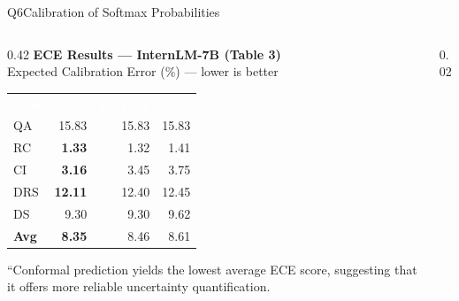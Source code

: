 \documentclass[aspectratio=169,10pt]{beamer}
\newcommand{\thead}[1]{%
  \cellcolor{TblHead}\textcolor{white}{\textbf{\footnotesize #1}}}
\newcommand{\talt}{\rowcolor{TblAlt}}
\begin{document}
\begin{frame}{Q6\enspace Calibration of Softmax Probabilities}

\begin{columns}[T]
  \begin{column}{0.42\textwidth}
    {\small\bfseries\color{darkred}ECE Results — InternLM-7B (Table 3)}\\
    {\fontsize{7.5}{9}\selectfont\color{Slate}Expected Calibration Error (\%) — lower is better}
    \vspace{0.35em}

    \renewcommand{\arraystretch}{1.42}
    \begin{tabular}{@{}lrrr@{}}
    \thead{Task} & \thead{CP} & \thead{Entropy} & \thead{$P_{\max}$} \\
    \talt QA  & 15.83 & 15.83 & 15.83 \\
         RC  & \textcolor{GreenOk}{\bfseries 1.33}  & 1.32  & 1.41  \\
    \talt CI  & \textcolor{GreenOk}{\bfseries 3.16}  & 3.45  & 3.75  \\
         DRS & \textcolor{GreenOk}{\bfseries 12.11} & 12.40 & 12.45 \\
    \talt DS  & 9.30  & 9.30  & 9.62  \\
    \midrule
    \textbf{Avg} & \textcolor{GreenOk}{\bfseries 8.35} & 8.46 & 8.61 \\
    \end{tabular}

    \vspace{0.5em}
    {\footnotesize\color{Slate}
      ``Conformal prediction yields the lowest average ECE score, suggesting that it offers more reliable uncertainty quantification.}
  \end{column}

  \begin{column}{0.02\textwidth}\color{Rule}\vrule\end{column}


\end{columns}
\end{frame}
\end{document}
